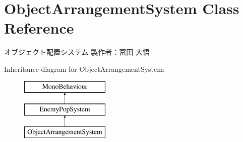 \hypertarget{class_object_arrangement_system}{}\section{Object\+Arrangement\+System Class Reference}
\label{class_object_arrangement_system}


オブジェクト配置システム 製作者：冨田 大悟  


Inheritance diagram for Object\+Arrangement\+System\+:\begin{figure}[H]
\begin{center}
\leavevmode
\includegraphics[height=3.000000cm]{class_object_arrangement_system}
\end{center}
\end{figure}
